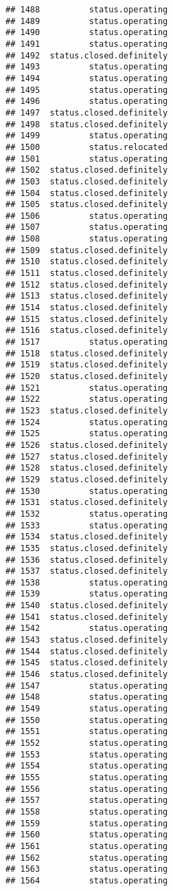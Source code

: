 \documentclass[
]{article}
\begin{document}
\begin{verbatim}
## 1488          status.operating
## 1489          status.operating
## 1490          status.operating
## 1491          status.operating
## 1492  status.closed.definitely
## 1493          status.operating
## 1494          status.operating
## 1495          status.operating
## 1496          status.operating
## 1497  status.closed.definitely
## 1498  status.closed.definitely
## 1499          status.operating
## 1500          status.relocated
## 1501          status.operating
## 1502  status.closed.definitely
## 1503  status.closed.definitely
## 1504  status.closed.definitely
## 1505  status.closed.definitely
## 1506          status.operating
## 1507          status.operating
## 1508          status.operating
## 1509  status.closed.definitely
## 1510  status.closed.definitely
## 1511  status.closed.definitely
## 1512  status.closed.definitely
## 1513  status.closed.definitely
## 1514  status.closed.definitely
## 1515  status.closed.definitely
## 1516  status.closed.definitely
## 1517          status.operating
## 1518  status.closed.definitely
## 1519  status.closed.definitely
## 1520  status.closed.definitely
## 1521          status.operating
## 1522          status.operating
## 1523  status.closed.definitely
## 1524          status.operating
## 1525          status.operating
## 1526  status.closed.definitely
## 1527  status.closed.definitely
## 1528  status.closed.definitely
## 1529  status.closed.definitely
## 1530          status.operating
## 1531  status.closed.definitely
## 1532          status.operating
## 1533          status.operating
## 1534  status.closed.definitely
## 1535  status.closed.definitely
## 1536  status.closed.definitely
## 1537  status.closed.definitely
## 1538          status.operating
## 1539          status.operating
## 1540  status.closed.definitely
## 1541  status.closed.definitely
## 1542          status.operating
## 1543  status.closed.definitely
## 1544  status.closed.definitely
## 1545  status.closed.definitely
## 1546  status.closed.definitely
## 1547          status.operating
## 1548          status.operating
## 1549          status.operating
## 1550          status.operating
## 1551          status.operating
## 1552          status.operating
## 1553          status.operating
## 1554          status.operating
## 1555          status.operating
## 1556          status.operating
## 1557          status.operating
## 1558          status.operating
## 1559          status.operating
## 1560          status.operating
## 1561          status.operating
## 1562          status.operating
## 1563          status.operating
## 1564          status.operating

\end{verbatim}
\end{document}
